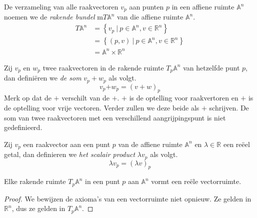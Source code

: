 \documentclass[main.tex]{subfiles}
\begin{document}
\begin{de}
  De verzameling van alle raakvectoren $v_{p}$ aan punten $p$ in een affiene ruimte $\mathbb{A}^{n}$ noemen we de \emph{rakende bundel} m$T\mathbb{A}^{n}$ van die affiene ruimte $\mathbb{A}^{n}$.
  \[
  \begin{array}{rl}
  T\mathbb{A}^{n} &= \left\{v_{p}\ |\ p \in \mathbb{A}^{n}, v \in \mathbb{R}^{n} \right\}\\
                 &= \left\{(p,v)\ |\ p \in\mathbb{A}^{n}, v \in \mathbb{R}^{n} \right\}\\
                 &= \mathbb{A}^{n} \times \mathbb{R}^{n}
  \end{array}
  \]
\end{de}

\begin{de}
  Zij $v_{p}$ en $w_{p}$ twee raakvectoren in de rakende ruimte $T_{p}\mathbb{A}^{n}$ van hetzelfde punt $p$, dan defini\"eren we \emph{de som} $v_{p}+w_{p}$ als volgt.
  \[ v_{p} \boldsymbol{ + } w_{p} = (v + w)_{p}\]
  Merk op dat de $\boldsymbol{ + }$ verschilt van de $+$. $\boldsymbol{ + }$ is de optelling voor raakvertoren en $+$ is de optelling voor vrije vectoren. Verder zullen we deze beide als $+$ schrijven.
  De som van twee raakvectoren met een verschillend aangrijpingspunt is niet gedefinieerd.
\end{de}

\begin{de}
  Zij $v_{p}$ een raakvector aan een punt $p$ van de affiene ruimte $\mathbb{A}^{n}$ en $\lambda \in \mathbb{R}$ een re\"eel getal, dan definieren we \emph{het scalair product} $\lambda v_{p}$ als volgt. 
  \[ \lambda v_{p} = (\lambda v)_{p}\]
\end{de}

\begin{st}
  \label{st:rakende-ruimte-is-vectorruimte}
  Elke rakende ruimte $T_{p}\mathbb{A}^{n}$ in een punt $p$ aan $\mathbb{A}^{n}$ vormt een re\"ele vectorruimte.
  \begin{proof}
    We bewijzen de axioma's van een vectorruimte niet opnieuw.
    Ze gelden in $\mathbb{R}^{n}$, dus ze gelden in $T_{p}\mathbb{A}^{n}$.
  \end{proof}
\end{st}
\end{document}
